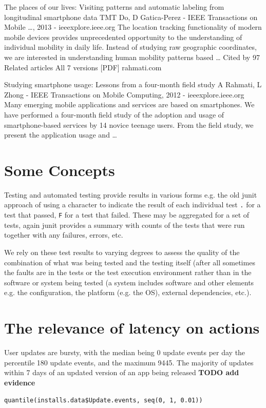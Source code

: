 The places of our lives: Visiting patterns and automatic labeling from longitudinal smartphone data
TMT Do, D Gatica-Perez - IEEE Transactions on Mobile …, 2013 - ieeexplore.ieee.org
The location tracking functionality of modern mobile devices provides unprecedented
opportunity to the understanding of individual mobility in daily life. Instead of studying raw
geographic coordinates, we are interested in understanding human mobility patterns based …
  Cited by 97 Related articles All 7 versions
[PDF] rahmati.com

Studying smartphone usage: Lessons from a four-month field study
A Rahmati, L Zhong - IEEE Transactions on Mobile Computing, 2012 - ieeexplore.ieee.org
Many emerging mobile applications and services are based on smartphones. We have
performed a four-month field study of the adoption and usage of smartphone-based services
by 14 novice teenage users. From the field study, we present the application usage and …

\section{Some Concepts}
Testing and automated testing provide results in various forms e.g. the old junit approach of using a character to indicate the result of each individual test \texttt{.} for a test that passed, \texttt{F} for a test that failed. These may be aggregated for a set of tests, again junit provides a summary with counts of the tests that were run together with any failures, errors, etc. 

We rely on these test results to varying degrees to assess the quality of the combination of what was being tested and the testing itself (after all sometimes the faults are in the tests or the test execution environment rather than in the software or system being tested (a system includes software and other elements e.g. the configuration, the platform (e.g. the OS), external dependencies, etc.).

\section{The relevance of latency on actions}
User updates are bursty, with the median being 0 update events per day the  percentile 180 update events, and the maximum 9445. The majority of updates within 7 days of an updated version of an app being released \textbf{TODO add evidence}

\texttt{quantile(installs.data\$Update.events, seq(0, 1, 0.01))}

